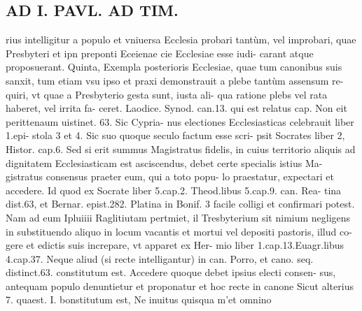 \documentclass{article}
\begin{document}
\begin{pages}
\section*{AD I. PAVL. AD TIM. }
\marginpar{[ p.513 ]}\pstart rius intelligitur a populo et vniuersa Ecclesia probari tantùm, vel improbari, quae Presbyteri et ipn preponti Eceienae cie Ecclesiae esse iudi- carant atque proposuerant.  \pend\pstart Quinta, Exempla posterioris Ecclesiae, quae tum canonibus suis sanxit, tum etiam vsu ipso et praxi demonstrauit a plebe tantùm assensum re- quiri, vt quae a Presbyterio gesta sunt, iusta ali- qua ratione plebs vel rata haberet, vel irrita fa- ceret. Laodice. Synod. can.13. qui est relatus cap. Non eit perittenaum uistinet. 63. Sic Cypria- nus electiones Ecclesiasticas celebrauit liber 1.epi- stola 3 et 4. Sic suo quoque seculo factum esse scri- psit Socrates liber 2, Histor. cap.6.  \pend\pstart Sed si erit summus Magistratus fidelis, in cuius territorio aliquis ad dignitatem Ecclesiasticam est asciscendus, debet certe specialis istius Ma- gistratus consensus praeter eum, qui a toto popu- lo praestatur, expectari et accedere. Id quod ex Socrate liber 5.cap.2. Theod.libus 5.cap.9. can. Rea- tina dist.63, et Bernar. epist.282. Platina in Bonif. 3 facile colligi et confirmari potest. Nam ad eum Ipluiiii Raglitiutam pertmiet, il Tresbyterium sit nimium negligens in substituendo aliquo in locum vacantis et mortui vel depositi pastoris, illud co- gere et edictis suis increpare, vt apparet ex Her- mio liber 1.cap.13.Euagr.libus 4.cap.37. Neque aliud (si recte intelligantur) in can. Porro, et cano. seq. distinct.63. constitutum est.  \pend\pstart Accedere quoque debet ipsius electi consen- sus, antequam populo denuntietur et proponatur et hoc recte in canone Sicut alterius 7. quaest. I. bonstitutum est, Ne inuitus quisqua m'et omnino  \pend

\end{pages}
\end{document}
